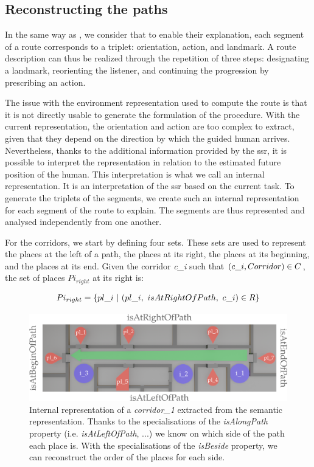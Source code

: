 \subsection{Reconstructing the paths}

In the same way as \cite{tversky_1999_pictorial}, we consider that to enable their explanation, each segment of a route corresponds to a triplet: orientation, action, and landmark. A route description can thus be realized through the repetition of three steps: designating a landmark, reorienting the listener, and continuing the progression by prescribing an action.

The issue with the environment representation used to compute the route is that it is not directly usable to generate the formulation of the procedure. With the current representation, the orientation and action are too complex to extract, given that they depend on the direction by which the guided human arrives. Nevertheless, thanks to the additional information provided by the \acrlong{ssr}, it is possible to interpret the representation in relation to the estimated future position of the human. This interpretation is what we call an internal representation. It is an interpretation of the \acrshort{ssr} based on the current task. To generate the triplets of the segments, we create such an internal representation for each segment of the route to explain. The segments are thus represented and analysed independently from one another.

For the corridors, we start by defining four sets. These sets are used to represent the places at the left of a path, the places at its right, the places at its beginning, and the places at its end. Given the corridor \textit{c\_i} such that $(c\_i, Corridor) \in C$, the set of places $Pi_{right}$ at its right is:

\begin{gather*}
Pi_{right} = \{ pl\_i\ |\ (pl\_i,\ isAtRightOfPath,\ c\_i) \in R \}
\end{gather*}

\begin{figure}[h!]
\centering
\includegraphics[width=\textwidth]{figures/chapter3/corridor.png}
\caption{\label{fig:chap3_corridor} Internal representation of a \textit{corridor\_1} extracted from the semantic representation. Thanks to the specialisations of the \textit{isAlongPath} property (i.e. \textit{isAtLeftOfPath}, ...) we know on which side of the path each place is. With the specialisations of the \textit{isBeside} property, we can reconstruct the order of the places for each side. }
\end{figure}

